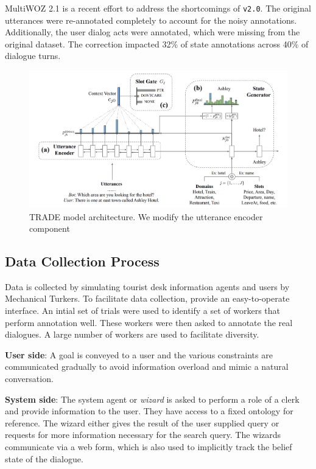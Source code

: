 \documentclass[12pt,a4paper]{article}
\begin{document}
MultiWOZ 2.1 is a recent effort to address the shortcomings of  \texttt{v2.0}. The original utterances were re-annotated completely to account for the noisy annotations. Additionally, the user dialog acts were annotated, which were missing from the original dataset. The correction impacted 32\% of state annotations across 40\% of dialogue turns.

\begin{figure}[!ht]
  \centering
  \includegraphics[width=\textwidth]{./images/trade.png}
  \caption{TRADE model architecture. We modify the utterance encoder component}
\end{figure}

\subsection{Data Collection Process}

Data is collected by simulating tourist desk information agents and users by Mechanical Turkers. To facilitate data collection, \cite{Budzianowski2018MultiWOZA} provide an easy-to-operate interface. An intial set of trials were used to identify a set of workers that perform annotation well. These workers were then asked to annotate the real dialogues. A large number of workers are used to facilitate diversity.

\medskip \noindent \textbf{User side}: A goal is conveyed to a user and the various constraints are communicated gradually to avoid information overload and mimic a natural conversation.

\medskip \noindent \textbf{System side}: The system agent or \textit {wizard} is asked to perform a role of a clerk and provide information to the user. They have access to a fixed ontology for reference. The wizard either gives the result of the user supplied query or requests for more information necessary for the search query. The wizards communicate via a web form, which is also used to implicitly track the belief state of the dialogue.
\end{document}
